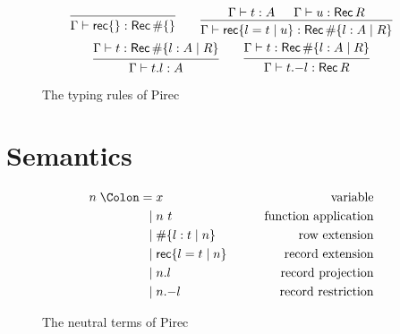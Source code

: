\begin{figure}
\begin{gather*}
\begin{prooftree}
      \infer0{\Gamma \vdash \RecordLit \{ \} : \RecordType \# \{ \}}
    \end{prooftree}
    \qquad
    \begin{prooftree}
      \hypo{\Gamma \vdash t : A}
      \hypo{\Gamma \vdash u : \RecordType R}
      \infer2{\Gamma \vdash \RecordLit \{ l = t \mid u \}
        : \RecordType \# \{ l : A \mid R \}}
    \end{prooftree}
    \\
    \begin{prooftree}
      \hypo{\Gamma \vdash t : \RecordType \# \{ l : A \mid R \}}
      \infer1{\Gamma \vdash t.l : A}
    \end{prooftree}
    \qquad
    \begin{prooftree}
      \hypo{\Gamma \vdash t : \RecordType \# \{ l : A \mid R \}}
      \infer1{\Gamma \vdash t \RecordRestr l : \RecordType R}
    \end{prooftree}
  \end{gather*}
  \caption{The typing rules of Pirec}\label{fig:typing}
\end{figure}

\section{Semantics}

\begin{figure}
  \begin{alignat*}{2}
    n \Coleqq{} & x
                & \qquad\text{variable}             \\
    \mid{}      & n\ t
                & \qquad\text{function application} \\
    \mid{}      & \# \{ l : t \mid n \}
                & \qquad\text{row extension}        \\
    \mid{}      & {\RecordLit \{ l = t \mid n \}}
                & \qquad\text{record extension}     \\
    \mid{}      & n.l
                & \qquad\text{record projection}    \\
    \mid{}      & n \RecordRestr l
                & \qquad\text{record restriction}
  \end{alignat*}
  \caption{The neutral terms of Pirec}\label{fig:neutral}
\end{figure}

